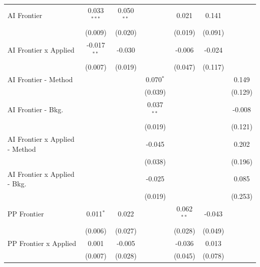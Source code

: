 \begin{tabular}{lcccccc}
   AI Frontier                    & 0.033$^{***}$ & 0.050$^{**}$ &              & 0.021         & 0.141         &   \\   
                                  & (0.009)       & (0.020)      &              & (0.019)       & (0.091)       &   \\   
   AI Frontier x Applied          & -0.017$^{**}$ & -0.030       &              & -0.006        & -0.024        &   \\   
                                  & (0.007)       & (0.019)      &              & (0.047)       & (0.117)       &   \\   
   AI Frontier - Method           &               &              & 0.070$^{*}$  &               &               & 0.149\\   
                                  &               &              & (0.039)      &               &               & (0.129)\\   
   AI Frontier - Bkg.             &               &              & 0.037$^{**}$ &               &               & -0.008\\   
                                  &               &              & (0.019)      &               &               & (0.121)\\   
   AI Frontier x Applied - Method &               &              & -0.045       &               &               & 0.202\\   
                                  &               &              & (0.038)      &               &               & (0.196)\\   
   AI Frontier x Applied - Bkg.   &               &              & -0.025       &               &               & 0.085\\   
                                  &               &              & (0.019)      &               &               & (0.253)\\   
   PP Frontier                    & 0.011$^{*}$   & 0.022        &              & 0.062$^{**}$  & -0.043        &   \\   
                                  & (0.006)       & (0.027)      &              & (0.028)       & (0.049)       &   \\   
   PP Frontier x Applied          & 0.001         & -0.005       &              & -0.036        & 0.013         &   \\   
                                  & (0.007)       & (0.028)      &              & (0.045)       & (0.078)       &   \\   

\end{tabular}
